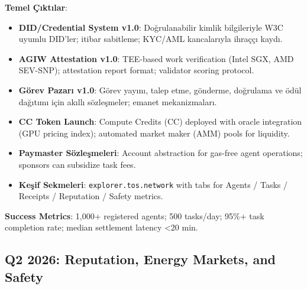 \documentclass[11pt]{article}
\begin{document}
\begin{itemize}[noitemsep]
\begin{itemize}[noitemsep]
\begin{itemize}[noitemsep]
\begin{itemize}[noitemsep]
\begin{itemize}[noitemsep]
\begin{itemize}[noitemsep]
\begin{itemize}[noitemsep]
\begin{enumerate}[noitemsep]
\begin{itemize}[noitemsep]
\textbf{Temel Çıktılar}:
\begin{itemize}[noitemsep]
  \item \textbf{DID/Credential System v1.0}: Doğrulanabilir kimlik bilgileriyle W3C uyumlu DID'ler; itibar sabitleme; KYC/AML kancalarıyla ihraççı kaydı.
  \item \textbf{AGIW Attestation v1.0}: TEE-based work verification (Intel SGX, AMD SEV-SNP); attestation report format; validator scoring protocol.
  \item \textbf{Görev Pazarı v1.0}: Görev yayını, talep etme, gönderme, doğrulama ve ödül dağıtımı için akıllı sözleşmeler; emanet mekanizmaları.
  \item \textbf{CC Token Launch}: Compute Credits (CC) deployed with oracle integration (GPU pricing index); automated market maker (AMM) pools for liquidity.
  \item \textbf{Paymaster Sözleşmeleri}: Account abstraction for gas-free agent operations; sponsors can subsidize task fees.
  \item \textbf{Keşif Sekmeleri}: \texttt{explorer.tos.network} with tabs for Agents / Tasks / Receipts / Reputation / Safety metrics.
\end{itemize}

\textbf{Success Metrics}: 1,000+ registered agents; 500 tasks/day; 95\%+ task completion rate; median settlement latency <20 min.

\subsection{Q2 2026: Reputation, Energy Markets, and Safety}


\end{itemize}
\end{enumerate}
\end{itemize}
\end{itemize}
\end{itemize}
\end{itemize}
\end{itemize}
\end{itemize}
\end{itemize}
\end{document}
